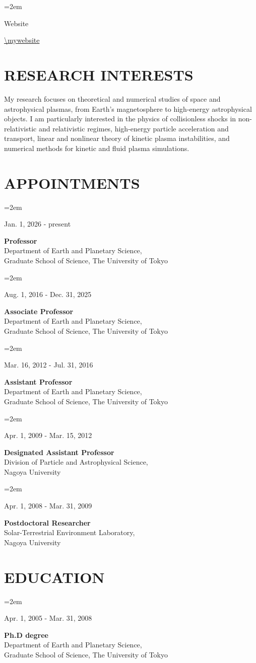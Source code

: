 \documentclass[lualatex,a4paper,ja=standard]{scrartcl}
\newcommand{\NewPart}[2]{\section*{\uppercase{#1} #2}}
\newcommand{\GeneralEntry}[4]{
\noindent\hangindent=2em\hangafter=0
\parbox{#1}{#3}
\hspace{1em}
\parbox{#2}{#4} \par
\vspace{0.5em}
}
\begin{document}
\GeneralEntry{8em}{32em}{Website}{\url{\mywebsite}}

\NewPart{Research Interests}{}
My research focuses on theoretical and numerical studies of space and astrophysical plasmas, from Earth's magnetosphere to high-energy astrophysical objects. I am particularly interested in the physics of collisionless shocks in non-relativistic and relativistic regimes, high-energy particle acceleration and transport, linear and nonlinear theory of kinetic plasma instabilities, and numerical methods for kinetic and fluid plasma simulations.

\clearpage

\NewPart{Appointments}{}

\GeneralEntry{14em}{28em}{Jan. 1, 2026 - present}
{\textbf{Professor}\\
	Department of Earth and Planetary Science,\\
	Graduate School of Science, The University of Tokyo}

\GeneralEntry{14em}{28em}{Aug. 1, 2016 - Dec. 31, 2025}
{\textbf{Associate Professor}\\
	Department of Earth and Planetary Science,\\
	Graduate School of Science, The University of Tokyo}

\GeneralEntry{14em}{28em}{Mar. 16, 2012 - Jul. 31, 2016}
{\textbf{Assistant Professor}\\
	Department of Earth and Planetary Science,\\
	Graduate School of Science, The University of Tokyo}

\GeneralEntry{14em}{28em}{Apr. 1, 2009 - Mar. 15, 2012}
{\textbf{Designated Assistant Professor}\\
	Division of Particle and Astrophysical Science,\\
	Nagoya University}

\GeneralEntry{14em}{28em}{Apr. 1, 2008 - Mar. 31, 2009}
{\textbf{Postdoctoral Researcher}\\
	Solar-Terrestrial Environment Laboratory,\\
	Nagoya University}


\NewPart{Education}{}

\GeneralEntry{14em}{28em}{Apr. 1, 2005 - Mar. 31, 2008}
{\textbf{Ph.D degree}\\
	Department of Earth and Planetary Science,\\
	Graduate School of Science, The University of Tokyo}
\end{document}
